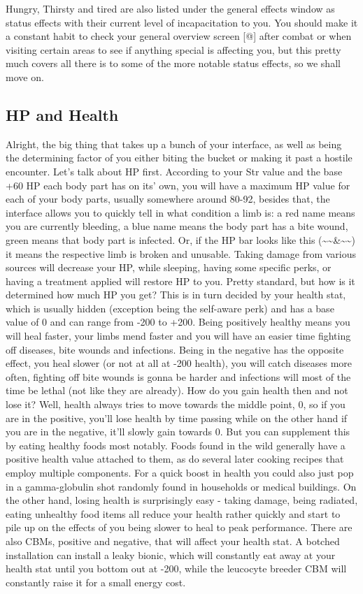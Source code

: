 \documentclass[11pt]{report}
\begin{document}
Hungry, Thirsty and tired are also listed under the general effects window as status effects with their current level of incapacitation to you.
You should make it a constant habit to check your general overview screen [@] after combat or when visiting certain areas to see if anything special is affecting you, but this pretty much covers all there is to some of the more notable status effects, so we shall move on.

\subsection{HP and Health}

Alright, the big thing that takes up a bunch of your interface, as well as being the determining factor of you either biting the bucket or making it past a hostile encounter. Let's talk about HP first. According to your Str value and the base +60 HP each body part has on its' own, you will have a maximum HP value for each of your body parts, usually somewhere around 80-92, besides that, the interface allows you to quickly tell in what condition a limb is: a red name means you are currently bleeding, a blue name means the body part has a bite wound, green means that body part is infected. Or, if the HP bar looks like this (\~{}\~{}\&\~{}\~{}) it means the respective limb is broken and unusable.
Taking damage from various sources will decrease your HP, while sleeping, having some specific perks, or having a treatment applied will restore HP to you. Pretty standard, but how is it determined how much HP you get? This is in turn decided by your health stat, which is usually hidden (exception being the self-aware perk) and has a base value of 0 and can range from -200 to +200. Being positively healthy means you will heal faster, your limbs mend faster and you will have an easier time fighting off diseases, bite wounds and infections. Being in the negative has the opposite effect, you heal slower (or not at all at -200 health), you will catch diseases more often, fighting off bite wounds is gonna be harder and infections will most of the time be lethal (not like they are already). How do you gain health then and not lose it? Well, health always tries to move towards the middle point, 0, so if you are in the positive, you'll lose health by time passing while on the other hand if you are in the negative, it'll slowly gain towards 0. But you can supplement this by eating healthy foods most notably. Foods found in the wild generally have a positive health value attached to them, as do several later cooking recipes that employ multiple components. For a quick boost in health you could also just pop in a gamma-globulin shot randomly found in households or medical buildings. On the other hand, losing health is surprisingly easy - taking damage, being radiated, eating unhealthy food items all reduce your health rather quickly and start to pile up on the effects of you being slower to heal to peak performance. There are also CBMs, positive and negative, that will affect your health stat. A botched installation can install a leaky bionic, which will constantly eat away at your health stat until you bottom out at -200, while the leucocyte breeder CBM will constantly raise it for a small energy cost.
\end{document}
